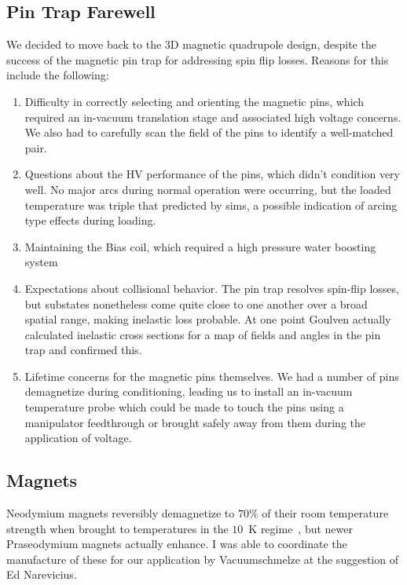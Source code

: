 \documentclass[defaultstyle,11pt]{thesis}
\begin{document}
\subsection{Pin Trap Farewell}

We decided to move back to the 3D magnetic quadrupole design, despite the success of the magnetic pin trap for addressing spin flip losses.
Reasons for this include the following:
\begin{enumerate}
\item Difficulty in correctly selecting and orienting the magnetic pins, which required an in-vacuum translation stage and associated high voltage concerns. We also had to carefully scan the field of the pins to identify a well-matched pair.
\item Questions about the HV performance of the pins, which didn't condition very well. 
No major arcs during normal operation were occurring, but the loaded temperature was triple that predicted by sims, a possible indication of arcing type effects during loading.
\item Maintaining the Bias coil, which required a high pressure water boosting system~\cite{}
\item Expectations about collisional behavior. The pin trap resolves spin-flip losses, but substates nonetheless come quite close to one another over a broad spatial range, making inelastic loss probable. At one point Goulven actually calculated inelastic cross sections for a map of fields and angles in the pin trap and confirmed this.
\item Lifetime concerns for the magnetic pins themselves. We had a number of pins demagnetize during conditioning, leading us to install an in-vacuum temperature probe which could be made to touch the pins using a manipulator feedthrough or brought safely away from them during the application of voltage.
\end{enumerate}

\subsection{Magnets}

Neodymium magnets reversibly demagnetize to $70\%$ of their room temperature strength when brought to temperatures in the $10$~K regime~\cite{}, but newer Praseodymium magnets actually enhance.
I was able to coordinate the manufacture of these for our application by Vacuumschmelze at the suggestion of Ed Narevicius.
\end{document}
